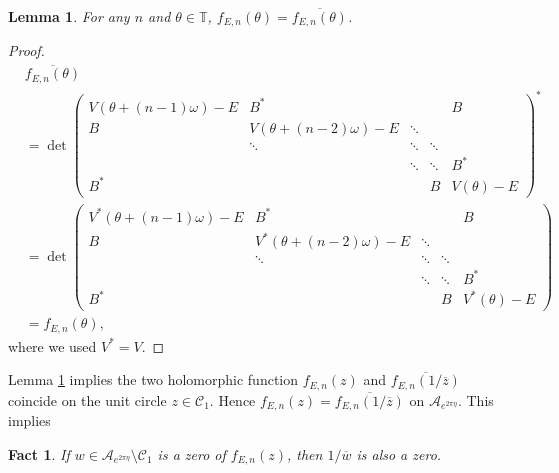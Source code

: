 \documentclass[11pt]{amsart}
\newtheorem{lemma}[theorem]{Lemma}
\newtheorem{fact}[theorem]{Fact}
\newcommand{\T}{\mathbb T}
\begin{document}
\begin{lemma}\label{lem:otf=tf}
    For any $n$ and $\theta\in \T$, $f_{E,n}(\theta)=\overline{f_{E,n}(\theta)}$. 
\end{lemma}
\begin{proof}
\begin{align}
&\overline{f_{E,n}(\theta)}\\
&=\det
\left(\begin{matrix}
V(\theta+(n-1)\omega)-E & B^* & &  &B\\
B &V(\theta+(n-2)\omega)-E &\ddots \\
& \ddots &\ddots &\ddots \\
& &\ddots &\ddots &B^*\\
B^* & & &B &V(\theta)-E
\end{matrix}\right)^*\\
&=\det
\left(\begin{matrix}
V^*(\theta+(n-1)\omega)-E & B^* & &  &B\\
B &V^*(\theta+(n-2)\omega)-E &\ddots \\
& \ddots &\ddots &\ddots \\
& &\ddots &\ddots &B^*\\
B^* & & &B &V^*(\theta)-E
\end{matrix}\right)\\
&=f_{E,n}(\theta),
\end{align}
where we used $V^*=V$.
\end{proof}
Lemma \ref{lem:otf=tf} implies the two holomorphic function $f_{E,n}(z)$ and $\overline{f_{E,n}(1/\overline{z})}$ coincide on the unit circle $z\in \mathcal{C}_1$.
Hence $f_{E,n}(z)=\overline{f_{E,n}(1/\overline{z})}$ on $\mathcal{A}_{e^{2\pi\eta}}$.
This implies 
\begin{fact}\label{fact:fn_real_zero}
    If $w\in \mathcal{A}_{e^{2\pi\eta}}\setminus \mathcal{C}_1$ is a zero of $f_{E,n}(z)$, then $1/\overline{w}$ is also a zero.
\end{fact}
\end{document}
